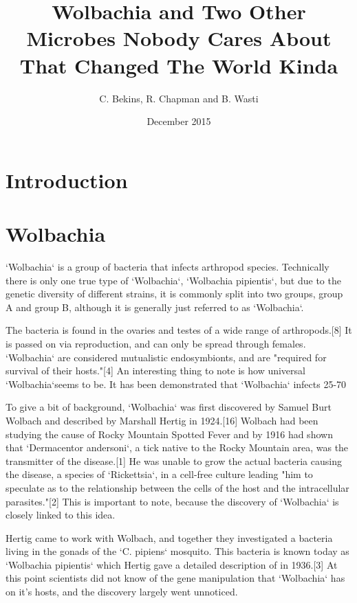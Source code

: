 \documentclass[twocolumn]{article}
\begin{document}
\title{Wolbachia and Two Other Microbes Nobody Cares About That Changed The World Kinda}
    \author{C. Bekins, R. Chapman and B. Wasti}
    \date{December 2015}
    \maketitle

\section*{Introduction}
\section*{Wolbachia}
`Wolbachia` is a group of bacteria that infects arthropod species. Technically there is only one true type of `Wolbachia`, `Wolbachia pipientis`, but due to the genetic diversity of different strains, it is commonly split into two groups, group A and group B, although it is generally just referred to as `Wolbachia`.

The bacteria is found in the ovaries and testes of a wide range of arthropods.[8] It is passed on via reproduction, and can only be spread through females. `Wolbachia` are considered mutualistic endosymbionts, and are "required for survival of their hosts."[4] An interesting thing to note is how universal `Wolbachia`seems to be. It has been demonstrated that `Wolbachia` infects 25-70%

To give a bit of background, `Wolbachia` was first discovered by Samuel Burt Wolbach and described by Marshall Hertig in 1924.[16] Wolbach had been studying the cause of Rocky Mountain Spotted Fever and by 1916 had shown that `Dermacentor andersoni`, a tick native to the Rocky Mountain area, was the transmitter of the disease.[1] He was unable to grow the actual bacteria causing the disease, a species of `Rickettsia`, in a cell-free culture leading "him to speculate as to the relationship between the cells of the host and the intracellular parasites."[2] This is important to note, because the discovery of `Wolbachia` is closely linked to this idea.

Hertig came to work with Wolbach, and together they investigated a bacteria living in the gonads of the `C. pipiens` mosquito. This bacteria is known today as `Wolbachia pipientis` which Hertig gave a detailed description of in 1936.[3] At this point scientists did not know of the gene manipulation that `Wolbachia` has on it's hosts, and the discovery largely went unnoticed.
\end{document}
